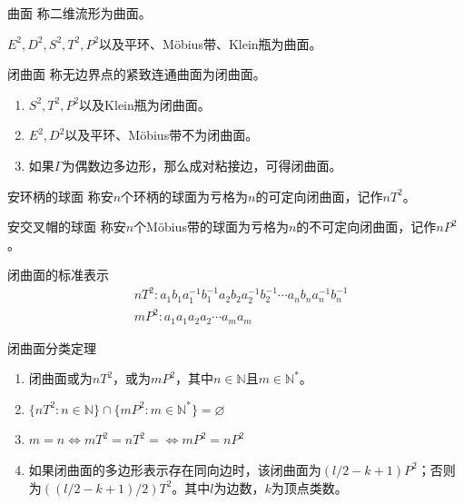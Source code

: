 \documentclass[lang = cn, scheme = chinese, thmcnt = section, usesamecnt]{elegantbook}
\newcommand{\N}{\mathbb{N}}            %
\begin{document}
\begin{definition}{曲面}
	称二维流形为曲面。
\end{definition}

\begin{example}
	$E^2,D^2,S^2,T^2,P^2$以及平环、Möbius带、Klein瓶为曲面。
\end{example}

\begin{definition}{闭曲面}
	称无边界点的紧致连通曲面为闭曲面。
\end{definition}

\begin{example}
	\begin{enumerate}
		\item $S^2,T^2,P^2$以及Klein瓶为闭曲面。
		\item $E^2,D^2$以及平环、Möbius带不为闭曲面。
		\item 如果$\Gamma$为偶数边多边形，那么成对粘接边，可得闭曲面。
	\end{enumerate}
\end{example}

\begin{definition}{安环柄的球面}
	称安$n$个环柄的球面为亏格为$n$的可定向闭曲面，记作$nT^2$。
\end{definition}

\begin{definition}{安交叉帽的球面}
	称安$n$个Möbius带的球面为亏格为$n$的不可定向闭曲面，记作$nP^2$。
\end{definition}

\begin{definition}{闭曲面的标准表示}
	\begin{align*}
		& nT^2:a_1b_1a_1^{-1}b_1^{-1}a_2b_2a_2^{-1}b_2^{-1}\cdots a_nb_na_n^{-1}b_n^{-1}\\
		& mP^2:a_1a_1a_2a_2\cdots a_ma_m
	\end{align*}
\end{definition}

\begin{theorem}{闭曲面分类定理}
	\begin{enumerate}
		\item 闭曲面或为$nT^2$，或为$mP^2$，其中$n\in\N$且$m\in\N^*$。
		\item $\{ nT^2:n\in\N \}\cap \{ mP^2:m\in\N^* \}=\varnothing$
		\item $m=n\iff mT^2=nT^2=\iff mP^2=nP^2$
		\item 如果闭曲面的多边形表示存在同向边时，该闭曲面为$(l/2-k+1)P^2$；否则为$((l/2-k+1)/2)T^2$。其中$l$为边数，$k$为顶点类数。
	\end{enumerate}
\end{theorem}
\end{document}
